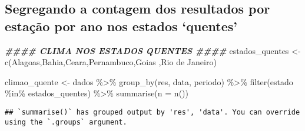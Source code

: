\documentclass[
]{article}
\newenvironment{Shaded}{\begin{snugshade}}{\end{snugshade}}
\newcommand{\AttributeTok}[1]{\textcolor[rgb]{0.77,0.63,0.00}{#1}}
\newcommand{\DocumentationTok}[1]{\textcolor[rgb]{0.56,0.35,0.01}{\textbf{\textit{#1}}}}
\newcommand{\FunctionTok}[1]{\textcolor[rgb]{0.00,0.00,0.00}{#1}}
\newcommand{\NormalTok}[1]{#1}
\newcommand{\OtherTok}[1]{\textcolor[rgb]{0.56,0.35,0.01}{#1}}
\newcommand{\SpecialCharTok}[1]{\textcolor[rgb]{0.00,0.00,0.00}{#1}}
\newcommand{\StringTok}[1]{\textcolor[rgb]{0.31,0.60,0.02}{#1}}
\begin{document}
\hypertarget{segregando-a-contagem-dos-resultados-por-estauxe7uxe3o-por-ano-nos-estados-quentes}{%
\subsection{Segregando a contagem dos resultados por estação por ano nos
estados
`quentes'}\label{segregando-a-contagem-dos-resultados-por-estauxe7uxe3o-por-ano-nos-estados-quentes}}

\begin{Shaded}
\begin{Highlighting}[]
\DocumentationTok{\#\#\#\# CLIMA NOS ESTADOS QUENTES \#\#\#\#}
\NormalTok{estados\_quentes }\OtherTok{\textless{}{-}} \FunctionTok{c}\NormalTok{(}\StringTok{\textquotesingle{}Alagoas\textquotesingle{}}\NormalTok{,}\StringTok{\textquotesingle{}Bahia\textquotesingle{}}\NormalTok{,}\StringTok{\textquotesingle{}Ceara\textquotesingle{}}\NormalTok{,}\StringTok{\textquotesingle{}Pernambuco\textquotesingle{}}\NormalTok{,}\StringTok{\textquotesingle{}Goias\textquotesingle{}}\NormalTok{ ,}\StringTok{\textquotesingle{}Rio de Janeiro\textquotesingle{}}\NormalTok{)}

\NormalTok{climao\_quente }\OtherTok{\textless{}{-}}\NormalTok{ dados }\SpecialCharTok{\%\textgreater{}\%} \FunctionTok{group\_by}\NormalTok{(res, data, periodo) }\SpecialCharTok{\%\textgreater{}\%} \FunctionTok{filter}\NormalTok{(estado }\SpecialCharTok{\%in\%}\NormalTok{ estados\_quentes) }\SpecialCharTok{\%\textgreater{}\%}
  \FunctionTok{summarise}\NormalTok{(}\AttributeTok{n =} \FunctionTok{n}\NormalTok{())}
\end{Highlighting}
\end{Shaded}

\begin{verbatim}
## `summarise()` has grouped output by 'res', 'data'. You can override using the `.groups` argument.
\end{verbatim}

\begin{Shaded}
\end{Shaded}
\end{document}
